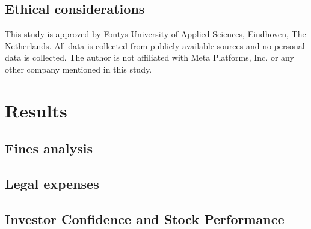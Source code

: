 \documentclass[12pt, a4paper]{article}
\begin{document}
\subsection*{Ethical considerations}

This study is approved by Fontys University of Applied Sciences, Eindhoven, The
Netherlands. All data is collected from publicly available sources and no
personal data is collected. The author is not affiliated with Meta Platforms,
Inc. or any other company mentioned in this study.

\section*{Results}

\subsection*{Fines analysis}



\subsection*{Legal expenses}


\subsection*{Investor Confidence and Stock Performance}

\end{document}
